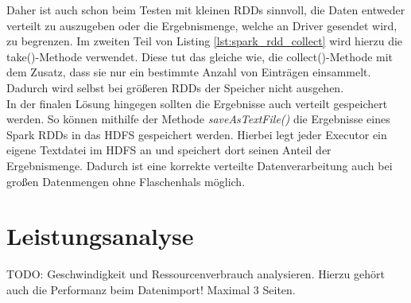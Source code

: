 \noindent
Daher ist auch schon beim Testen mit kleinen RDDs sinnvoll, die Daten entweder verteilt zu auszugeben oder die Ergebnismenge, welche an Driver gesendet wird, zu begrenzen. Im zweiten Teil von Listing \ref{lst:spark_rdd_collect}  wird hierzu die take()-Methode verwendet. Diese tut das gleiche wie, die collect()-Methode mit dem Zusatz, dass sie nur ein bestimmte Anzahl von Einträgen einsammelt. Dadurch wird selbst bei größeren RDDs der Speicher nicht ausgehen.\\
In der finalen Lösung hingegen sollten die Ergebnisse auch verteilt gespeichert werden.  So können mithilfe der Methode \textit{saveAsTextFile()} die Ergebnisse eines Spark RDDs in das HDFS gespeichert werden. Hierbei legt jeder Executor ein eigene Textdatei im HDFS an und speichert dort seinen Anteil der Ergebnismenge. Dadurch ist eine korrekte verteilte Datenverarbeitung auch bei großen Datenmengen ohne Flaschenhals möglich. 


\section{Leistungsanalyse}
\label{sec:performance_analysis}
TODO: Geschwindigkeit und Ressourcenverbrauch analysieren. Hierzu gehört auch die Performanz beim Datenimport! Maximal 3 Seiten.

